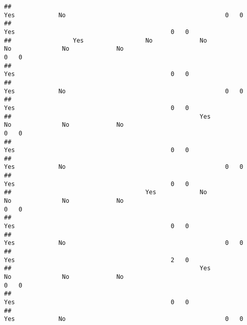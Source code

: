 \documentclass[
]{article}
\begin{document}
\begin{verbatim}
##                                                                                           Yes            No                                            0   0
##                                                                                                          Yes                                           0   0
##                 Yes                 No             No                     No              No             No                                            0   0
##                                                                                                          Yes                                           0   0
##                                                                                           Yes            No                                            0   0
##                                                                                                          Yes                                           0   0
##                                                    Yes                    No              No             No                                            0   0
##                                                                                                          Yes                                           0   0
##                                                                                           Yes            No                                            0   0
##                                                                                                          Yes                                           0   0
##                                     Yes            No                     No              No             No                                            0   0
##                                                                                                          Yes                                           0   0
##                                                                                           Yes            No                                            0   0
##                                                                                                          Yes                                           2   0
##                                                    Yes                    No              No             No                                            0   0
##                                                                                                          Yes                                           0   0
##                                                                                           Yes            No                                            0   0

\end{verbatim}
\end{document}
